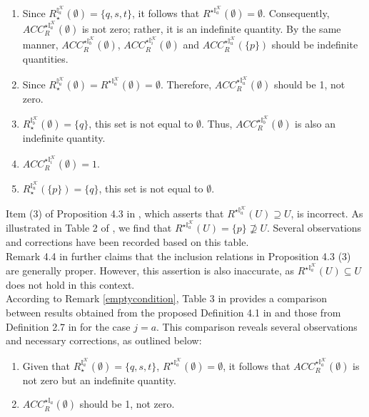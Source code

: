 \documentclass{article}
\theoremstyle{theorem}
\theoremstyle{definition}
\theoremstyle{remark}
\begin{document}
\begin{enumerate}
\item Since $R_{\star}^{\mathbb{I}_{a}^{\mathcal{K}}}(\emptyset)=\{q, s, t\}$, it follows that $R^{\star\mathbb{I}_{a}^{\mathcal{K}}}(\emptyset)=\emptyset$. Consequently, $ACC_{R}^{\star\mathbb{I}_{a}^{\mathcal{K}}}(\emptyset)$ is not zero; rather, it is an indefinite quantity. By the same manner, $ACC_{R}^{\star\mathbb{I}_{b}^{\mathcal{K}}}(\emptyset)$, $ACC_{R}^{\star\mathbb{I}_{i}^{\mathcal{K}}}(\emptyset)$ and $ACC_{R}^{\star\mathbb{I}_{u}^{\mathcal{K}}}(\{p\})$ should be indefinite quantities.
\item Since $R_{\star}^{\mathbb{I}_{u}^{\mathcal{K}}}(\emptyset)= R^{\star\mathbb{I}_{u}^{\mathcal{K}}}(\emptyset)=\emptyset $. Therefore, $ACC_{R}^{\star\mathbb{I}_{u}^{\mathcal{K}}}(\emptyset)$ should be 1, not zero.
\item $R_{\star}^{\mathbb{I}_{b}^{\mathcal{K}}}(\emptyset)=\{q\}$, this set is not equal to $\emptyset$. Thus, $ACC_{R}^{\star\mathbb{I}_{b}^{\mathcal{K}}}(\emptyset)$ is also an indefinite quantity.
\item $ACC_{R}^{\star\mathbb{I}_{i}^{\mathcal{K}}}(\emptyset) = 1$.
\item $R_{\star}^{\mathbb{I}_{u}^{\mathcal{K}}}(\{p\})=\{q\}$, this set is not equal to $\emptyset$.
 \color{black}
\end{enumerate}
\color{black}
Item (3) of Proposition 4.3 in \cite{Al-shami 2024}, which asserts that $R^{\star\mathbb{I}_{a}^{\mathcal{K}}}(U)\supseteq U$, is incorrect. As illustrated in Table 2 of \cite{Al-shami 2024}, we find that $R^{\star\mathbb{I}_{a}^{\mathcal{K}}}(U)=\{p\}\nsupseteq U$. Several observations and corrections have been recorded based on this table.\\

Remark 4.4 in \cite{Al-shami 2024} further claims that the inclusion relations in Proposition 4.3 (3) are generally proper. However, this assertion is also inaccurate, as  $R^{\star\mathbb{I}_{a}^{\mathcal{K}}}(U)\subseteq U$ does not hold in this context.\color{black}\\

According to Remark \ref{emptycondition}, Table 3 in \cite{Al-shami 2024} provides a comparison between results obtained from the proposed Definition 4.1 in \cite{Al-shami 2024} and those from Definition 2.7 in \cite{Al-shami 2021} for the case $j = a$. This comparison reveals several observations and necessary corrections, as outlined below:
\begin{enumerate}
\item Given that $R_{\star}^{\mathbb{I}_{a}^{\mathcal{K}}}(\emptyset)=\{q, s, t\}$, $R^{\star\mathbb{I}_{a}^{\mathcal{K}}}(\emptyset)=\emptyset$, it follows that $ACC_{R}^{\star\mathbb{I}_{a}^{\mathcal{K}}}(\emptyset)$ is not zero but an indefinite quantity.
\item $ACC_{R}^{\star\mathbb{I}_{a}}(\emptyset)$ should be 1, not zero.\\
\end{enumerate}
\end{document}

